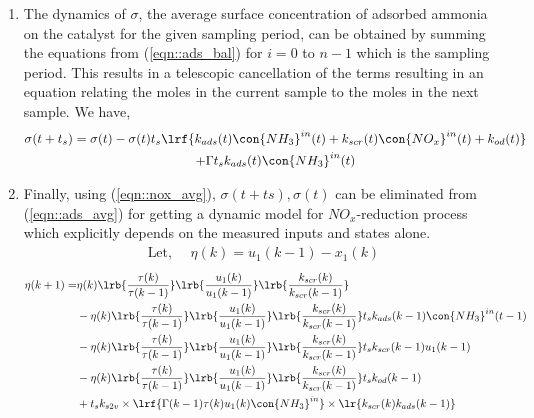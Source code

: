 \begin{enumerate}
        \item The dynamics of $\sigma$, the average surface concentration of adsorbed ammonia on the catalyst for the given sampling period, can be obtained by summing the equations from (\ref{eqn::ads_bal}) for $i = 0$ to $n-1$ which is the sampling period. This results in a telescopic cancellation of the terms resulting in an equation relating the moles in the current sample to the moles in the next sample. We have,
                \begin{multline}
                        \sigma(t + t_s) = \sigma(t) - \sigma(t) t_s \lrf{k_{ads}(t) \con{NH_3}^{in}(t)
                                                                                + k_{scr}(t) \con{NO_x}^{in}(t)
                                                                                + k_{od}(t)}
                                                \\
                                                + \Gamma t_s k_{ads}(t) \con{NH_3}^{in}(t)
                        \label{eqn::ads_avg}
                \end{multline}
        \item Finally, using (\ref{eqn::nox_avg}), $\sigma(t+ts), \sigma(t)$ can be eliminated from (\ref{eqn::ads_avg}) for getting a dynamic model for $NO_x$-reduction process which explicitly depends on the measured inputs and states alone.
                \begin{align}
                        \text{Let, }\quad \eta(k) = u_1(k-1) - x_1(k)
                \end{align}
\begin{align*}
        \eta(k+1) =& \eta(k) \lrb{\frac{\tau(k)}{\tau(k-1)}}
                                \lrb{\frac{u_1(k)}{u_1(k-1)}}
                                \lrb{\frac{k_{scr}(k)}{k_{scr}(k-1)}} \\
                &-\eta(k) \lrb{\frac{\tau(k)}{\tau(k-1)}}
                                \lrb{\frac{u_1(k)}{u_1(k-1)}}
                                \lrb{\frac{k_{scr}(k)}{k_{scr}(k-1)}}
                t_s k_{ads}(k-1) \con{NH_3}^{in}(t-1)
                \\
                &-\eta(k) \lrb{\frac{\tau(k)}{\tau(k-1)}}
                                \lrb{\frac{u_1(k)}{u_1(k-1)}}
                                \lrb{\frac{k_{scr}(k)}{k_{scr}(k-1)}}
                t_s k_{scr}(k-1) u_1(k-1)
                \\
                &-\eta(k) \lrb{\frac{\tau(k)}{\tau(k-1)}}
                                \lrb{\frac{u_1(k)}{u_1(k-1)}}
                                \lrb{\frac{k_{scr}(k)}{k_{scr}(k-1)}}
                t_s k_{od}(k-1)
                \\
                &+ t_s k_{s2v} \times \lrf{\Gamma(k-1) \tau(k) u_1(k) \con{NH_3}^{in}} \times \lr{k_{scr}(k) k_{ads}(k-1)}
\end{align*}
\begin{equation}
                \label{eqn::disc_NOx}
\end{equation}

\end{enumerate}

